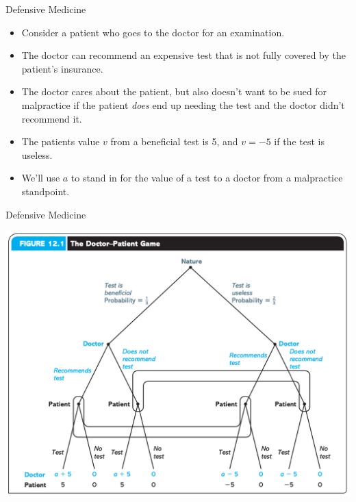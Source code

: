 
\begin{frame}{Defensive Medicine}
  \begin{itemize}
    \item 
    Consider a patient who goes to the doctor for an examination. 
    \item
    The doctor can recommend an expensive test
    that is not fully covered by the patient's insurance.
    \item 
    The doctor cares about the patient, 
    but also doesn't want to be sued for malpractice 
    if the patient \textit{does} end up needing the test 
    and the doctor didn't recommend it.
    \item 
    The patients value $v$ from a beneficial test is 5,
    and $v=-5$ if the test is useless.
    \item 
    We'll use $a$ to stand in for the value of a test to a doctor 
    from a malpractice standpoint.
  \end{itemize}
\end{frame}


\begin{frame}{Defensive Medicine}
  \begin{center}
    \includegraphics[width=.9\textwidth]{figures/defensivemed.png}  
  \end{center} 
\end{frame}


